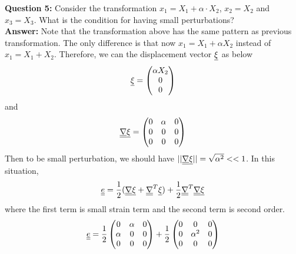 \documentclass[letter,12pt]{article}
\begin{document}
	\noindent \textbf{Question 5:} Consider the transformation $x_1=X_1+\alpha \cdot X_2$, $x_2=X_2$ and $x_3=X_3$. What is the condition for having small perturbations? \\
	
	\textbf{Answer:} Note that the transformation above has the same pattern as previous transformation. The only difference is that now $x_1 = X_1 + \alpha X_2$ instead of $x_1 = X_1 + X_2$. Therefore, we can the displacement vector $\underline{\xi}$ as below
	\begin{equation}
	\underline{\xi} = \left( \begin{matrix}
	\alpha X_2 \\ 0 \\ 0
	\end{matrix} \right)
	\end{equation}
	and 
	\begin{equation}
	\underline{\underline{\nabla}} \underline{\xi} = \left( \begin{matrix}
	0 & \alpha & 0 \\
	0 & 0 & 0 \\
	0 & 0 & 0
	\end{matrix} \right)
	\end{equation}
	Then to be small perturbation, we should have $||\underline{\underline{\nabla}} \underline{\xi} || = \sqrt{\alpha^2} << 1$. In this situation,
	\begin{equation}
	\underline{\underline{e}} = \frac{1}{2}(\underline{\underline{\nabla}} \underline{\xi} + \underline{\underline{\nabla}}^T \underline{\xi}) + \frac{1}{2} \underline{\underline{\nabla}}^T \underline{\underline{\nabla}} \underline{\xi}
	\end{equation}
	where the first term is small strain term and the second term is second order.
	\begin{equation}
	\underline{\underline{e}} = \frac{1}{2} \left( \begin{matrix}
	0 & \alpha & 0 \\
	\alpha & 0 & 0 \\
	0 & 0 & 0
	\end{matrix}\right) + \frac{1}{2} \left(
	\begin{matrix}
	0 & 0 & 0 \\
	0 & \alpha^2 & 0 \\
	0 & 0 & 0
	\end{matrix} \right)
	\end{equation}
	
 
\end{document}

